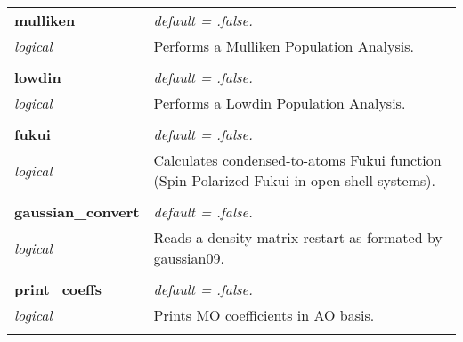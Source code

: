 \begin{Spacing}{1.0}
\begin{longtable}{ p{} p{} }
   \textbf{mulliken}
   &  \textit{default = .false. }
   \\*\textit{logical}
   & Performs a Mulliken Population Analysis.\\* \\

   \textbf{lowdin}
   &  \textit{default = .false. }
   \\*\textit{logical}
   & Performs a Lowdin Population Analysis.\\* \\

   \textbf{fukui}
   &  \textit{default = .false. }
   \\*\textit{logical}
   & Calculates condensed-to-atoms Fukui function (Spin
   Polarized Fukui in open-shell systems).\\* \\

   \textbf{gaussian\_convert}
   &  \textit{default = .false. }
   \\*\textit{logical}
   & Reads a density matrix restart as formated by
   gaussian09.\\* \\

   \textbf{print\_coeffs}
   &  \textit{default = .false. }
   \\*\textit{logical}
   & Prints MO coefficients in AO basis.\\* \\

\end{longtable}
\end{Spacing}
